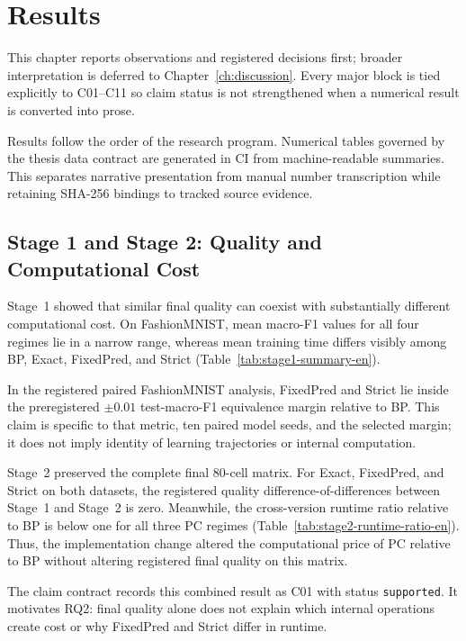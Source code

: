 \chapter{Results}
\label{ch:results-en}

This chapter reports observations and registered decisions first; broader
interpretation is deferred to Chapter~\ref{ch:discussion}. Every major block is tied
explicitly to C01--C11 so claim status is not strengthened when a numerical result is
converted into prose.

Results follow the order of the research program. Numerical tables governed by the
thesis data contract are generated in CI from machine-readable summaries. This
separates narrative presentation from manual number transcription while retaining
SHA-256 bindings to tracked source evidence.

\section{Stage 1 and Stage 2: Quality and Computational Cost}
\label{sec:results-stage12-en}

Stage~1 showed that similar final quality can coexist with substantially different
computational cost. On FashionMNIST, mean macro-F1 values for all four regimes lie in
a narrow range, whereas mean training time differs visibly among BP, Exact, FixedPred,
and Strict (Table~\ref{tab:stage1-summary-en}).



In the registered paired FashionMNIST analysis, FixedPred and Strict lie inside the
preregistered \(\pm0.01\) test-macro-F1 equivalence margin relative to BP. This claim
is specific to that metric, ten paired model seeds, and the selected margin; it does
not imply identity of learning trajectories or internal computation.

Stage~2 preserved the complete final 80-cell matrix. For Exact, FixedPred, and Strict
on both datasets, the registered quality difference-of-differences between Stage~1 and
Stage~2 is zero. Meanwhile, the cross-version runtime ratio relative to BP is below one
for all three PC regimes (Table~\ref{tab:stage2-runtime-ratio-en}). Thus, the
implementation change altered the computational price of PC relative to BP without
altering registered final quality on this matrix.

The claim contract records this combined result as C01 with status
\texttt{supported}. It motivates RQ2: final quality alone does not explain which
internal operations create cost or why FixedPred and Strict differ in runtime.

